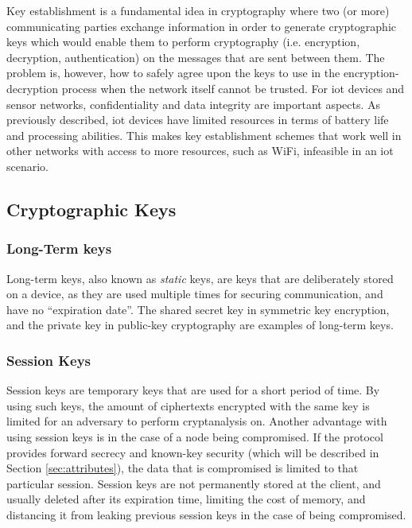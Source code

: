Key establishment is a fundamental idea in cryptography where two (or more) communicating parties exchange information in order to generate cryptographic keys which would enable them to perform cryptography (i.e. encryption, decryption, authentication) on the messages that are sent between them. The problem is, however, how to safely agree upon the keys to use in the encryption-decryption process when the network itself cannot be trusted. For \gls{iot} devices and sensor networks, confidentiality and data integrity are important aspects. As previously described, \gls{iot} devices have limited resources in terms of battery life and processing abilities. This makes key establishment schemes that work well in other networks with access to more resources, such as WiFi, infeasible in an \gls{iot} scenario.


\subsection{Cryptographic Keys}


\subsubsection{Long-Term keys}

Long-term keys, also known as \emph{static} keys, are keys that are deliberately stored on a device, as they are used multiple times for securing communication, and have no ``expiration date''. The shared secret key in symmetric key encryption, and the private key in public-key cryptography are examples of long-term keys.


\subsubsection{Session Keys}

Session keys are temporary keys that are used for a short period of time. By using such keys, the amount of ciphertexts encrypted with the same key is limited for an adversary to perform cryptanalysis on. Another advantage with using session keys is in the case of a node being compromised. If the protocol provides forward secrecy and known-key security (which will be described in Section \ref{sec:attributes}), the data that is compromised is limited to that particular session. Session keys are not permanently stored at the client, and usually deleted after its expiration time, limiting the cost of memory, and distancing it from leaking previous session keys in the case of being compromised.




